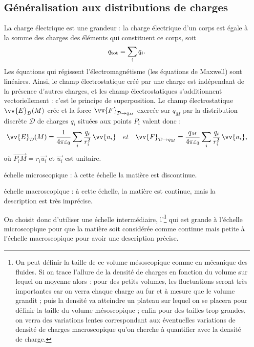 \documentclass[12pt,fancy]{/Users/victor/Documents/COURS/2ACapECL/texmf/tex/latex/Preambles/cours}
\begin{document}
\subsection{Généralisation aux distributions de charges}

La charge électrique est une grandeur : la charge électrique d'un corps est égale à la somme des charges des éléments qui constituent ce corps, soit
\begin{equation*}
q_{\rm{tot}}=\sum_{i}q_i.
\end{equation*}
Les équations qui régissent l’électromagnétisme (les équations de Maxwell) sont linéaires. Ainsi, le champ électrostatique créé par une charge est indépendant de la présence d’autres charges, et les champ électrostatiques s’additionnent vectoriellement : c’est le principe de superposition. Le champ électrostatique $\vv{E}_{\mathcal{D}}(M)$ crée et la force $\vv{F}_{\mathcal{D} \rightarrow q_M}$ exercée sur $q_{M}$ par la distribution discrète $\mathcal{D}$ de charges $q_i$ situées aux points $P_i$ valent donc :
\begin{equation*}
 \vv{E}_{\mathcal{D}}(M)=\frac{1}{4\pi\varepsilon_0}\sum_i\frac{q_i}{ r_i^2}\,\vv{u_i} \quad  et \quad \vv{F}_{\mathcal{D} \rightarrow q_M}=\frac{q_M}{4\pi\varepsilon_0}\sum_i\frac{q_i}{ r_i^2}\,\vv{u_i},
\end{equation*}
où $\Vec{P_iM} = r_i \Vec{u_i}$ et $ \Vec{u_i}$ est unitaire.

\begin{liste}
\item échelle microscopique : à cette échelle la matière est discontinue.
\item échelle macroscopique : à cette échelle, la matière est continue, mais la description est très imprécise.
\end{liste}
On choisit donc d'utiliser une échelle intermédiaire, l'\footnote{On peut définir la taille de ce volume mésoscopique comme en mécanique des fluides. Si on trace l’allure de la densité de charges en fonction du volume sur lequel on moyenne alors : pour des petits volumes, les fluctuations seront très importantes car on verra chaque charge au fur et à mesure que le volume grandit ; puis la densité va atteindre un plateau sur lequel on se placera pour définir la taille du volume mésoscopique ; enfin pour des tailles trop grandes, on verra des variations lentes correspondant aux éventuelles variations de densité de charges macroscopique qu'on cherche à quantifier avec la densité de charge.} qui est grande à l'échelle microscopique pour que la matière soit considérée comme continue mais petite à l'échelle macroscopique pour avoir une description précise.
\end{document}
